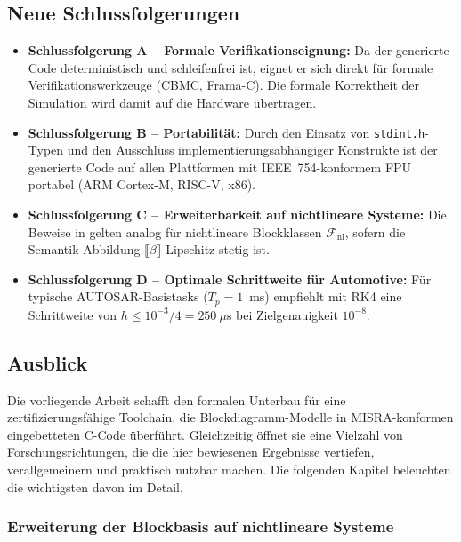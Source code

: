 ﻿\documentclass[12pt,a4paper]{article}
\theoremstyle{definition}
\begin{document}
\subsection{Neue Schlussfolgerungen}

\begin{itemize}
  \item \textbf{Schlussfolgerung A -- Formale Verifikationseignung:}
        Da der generierte Code deterministisch und schleifenfrei ist, eignet er
        sich direkt für formale Verifikationswerkzeuge (CBMC, Frama-C). Die
        formale Korrektheit der Simulation wird damit auf die Hardware
        übertragen.

  \item \textbf{Schlussfolgerung B -- Portabilität:}
        Durch den Einsatz von \texttt{stdint.h}-Typen und den Ausschluss
        implementierungsabhängiger Konstrukte ist der generierte Code auf
        allen Plattformen mit IEEE~754-konformem FPU portabel (ARM Cortex-M,
        RISC-V, x86).

  \item \textbf{Schlussfolgerung C -- Erweiterbarkeit auf nichtlineare Systeme:}
        Die Beweise in  gelten analog für
        nichtlineare Blockklassen $\mathcal{F}_{\mathrm{nl}}$, sofern die
        Semantik-Abbildung $\llbracket \beta \rrbracket$ Lipschitz-stetig ist.

  \item \textbf{Schlussfolgerung D -- Optimale Schrittweite für Automotive:}
        Für typische AUTOSAR-Basistasks ($T_p = 1$~ms) empfiehlt 
        mit RK4 eine Schrittweite von $h \leq 10^{-3}/4 = 250~\mu$s bei
        Zielgenauigkeit $10^{-8}$.
\end{itemize}

\subsection{Ausblick}

Die vorliegende Arbeit schafft den formalen Unterbau für eine
zertifizierungsfähige Toolchain, die Blockdiagramm-Modelle in
MISRA-konformen eingebetteten C-Code überführt. Gleichzeitig öffnet sie
eine Vielzahl von Forschungsrichtungen, die die hier bewiesenen Ergebnisse
vertiefen, verallgemeinern und praktisch nutzbar machen. Die folgenden
Kapitel beleuchten die wichtigsten davon im Detail.

\subsubsection{Erweiterung der Blockbasis auf nichtlineare Systeme}
\end{document}
